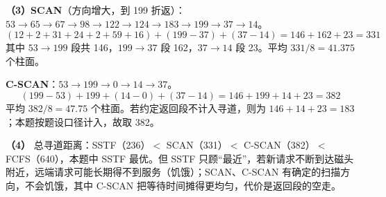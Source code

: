 \begin{enumerate}[start=7]
\textbf{（3）SCAN}（方向增大，到 199 折返）：$53\to65\to67\to98\to122\to124\to183\to199\to37\to14$。
\[
(12+2+31+24+2+59+16)+(199-37)+(37-14)=146+162+23=331
\]
其中 $53\to199$ 段共 146，$199\to37$ 段 162，$37\to14$ 段 23。平均 $331/8=41.375$ 个柱面。

\textbf{C-SCAN}：$53\to199\to0\to14\to37$。
\[
(199-53)+199+(14-0)+(37-14)=146+199+14+23=382
\]
平均 $382/8=47.75$ 个柱面。若约定返回段不计入寻道，则为 $146+14+23=183$；本题按题设口径计入，故取 382。

\textbf{（4）} 总寻道距离：SSTF（236）$<$ SCAN（331）$<$ C-SCAN（382）$<$ FCFS（640），本题中 SSTF 最优。但 SSTF 只顾“最近”，若新请求不断到达磁头附近，远端请求可能长期得不到服务（饥饿）；SCAN、C-SCAN 有确定的扫描方向，不会饥饿，其中 C-SCAN 把等待时间摊得更均匀，代价是返回段的空走。

\else \answerarea[12] \fi

\end{enumerate}
